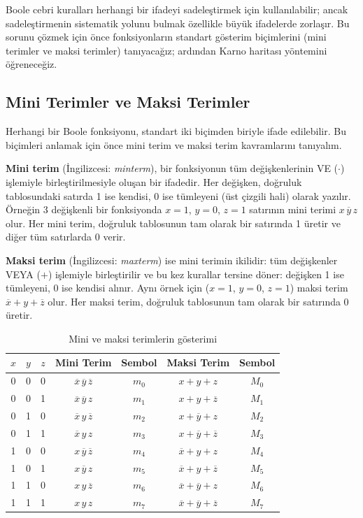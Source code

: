 Boole cebri kuralları herhangi bir ifadeyi sadeleştirmek için kullanılabilir; ancak sadeleştirmenin sistematik yolunu bulmak özellikle büyük ifadelerde zorlaşır. Bu sorunu çözmek için önce fonksiyonların standart gösterim biçimlerini (mini terimler ve maksi terimler) tanıyacağız; ardından Karno haritası yöntemini öğreneceğiz.

\subsection{Mini Terimler ve Maksi Terimler}

Herhangi bir Boole fonksiyonu, standart iki biçimden biriyle ifade edilebilir. Bu biçimleri anlamak için önce mini terim ve maksi terim kavramlarını tanıyalım.

\textbf{Mini terim} (İngilizcesi: \textit{minterm}), bir fonksiyonun tüm değişkenlerinin VE ($\cdot$) işlemiyle birleştirilmesiyle oluşan bir ifadedir. Her değişken, doğruluk tablosundaki satırda 1 ise kendisi, 0 ise tümleyeni (üst çizgili hali) olarak yazılır. Örneğin 3 değişkenli bir fonksiyonda $x=1$, $y=0$, $z=1$ satırının mini terimi $x\,\overline{y}\,z$ olur. Her mini terim, doğruluk tablosunun tam olarak bir satırında 1 üretir ve diğer tüm satırlarda 0 verir.

\textbf{Maksi terim} (İngilizcesi: \textit{maxterm}) ise mini terimin ikilidir: tüm değişkenler VEYA ($+$) işlemiyle birleştirilir ve bu kez kurallar tersine döner: değişken 1 ise tümleyeni, 0 ise kendisi alınır. Aynı örnek için ($x=1$, $y=0$, $z=1$) maksi terim $\overline{x}+y+\overline{z}$ olur. Her maksi terim, doğruluk tablosunun tam olarak bir satırında 0 üretir.

\begin{table}[H]
\centering
\caption{Mini ve maksi terimlerin gösterimi}
\label{tab:B.4}
\begin{tabular}{ccc|cc|cc}
\toprule
$x$ & $y$ & $z$ & \textbf{Mini Terim} & \textbf{Sembol} & \textbf{Maksi Terim} & \textbf{Sembol} \\
\midrule
0 & 0 & 0 & $\overline{x}\,\overline{y}\,\overline{z}$ & $m_0$ & $x+y+z$ & $M_0$ \\
0 & 0 & 1 & $\overline{x}\,\overline{y}\,z$ & $m_1$ & $x+y+\overline{z}$ & $M_1$ \\
0 & 1 & 0 & $\overline{x}\,y\,\overline{z}$ & $m_2$ & $x+\overline{y}+z$ & $M_2$ \\
0 & 1 & 1 & $\overline{x}\,y\,z$ & $m_3$ & $x+\overline{y}+\overline{z}$ & $M_3$ \\
1 & 0 & 0 & $x\,\overline{y}\,\overline{z}$ & $m_4$ & $\overline{x}+y+z$ & $M_4$ \\
1 & 0 & 1 & $x\,\overline{y}\,z$ & $m_5$ & $\overline{x}+y+\overline{z}$ & $M_5$ \\
1 & 1 & 0 & $x\,y\,\overline{z}$ & $m_6$ & $\overline{x}+\overline{y}+z$ & $M_6$ \\
1 & 1 & 1 & $x\,y\,z$ & $m_7$ & $\overline{x}+\overline{y}+\overline{z}$ & $M_7$ \\
\bottomrule
\end{tabular}
\end{table}

